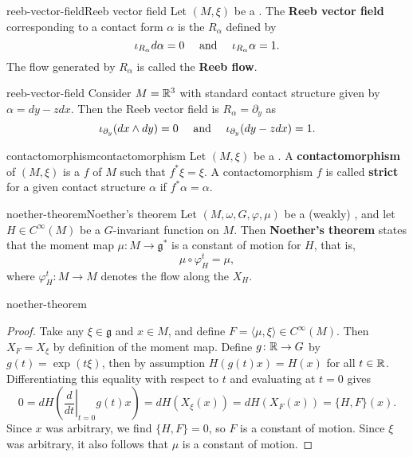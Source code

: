 \begin{topic}{reeb-vector-field}{Reeb vector field}
    Let $(M, \xi)$ be a . The \textbf{Reeb vector field} corresponding to a contact form $\alpha$ is the  $R_\alpha$ defined by
    \[ \iota_{R_\alpha} d \alpha = 0 \quad \textup{ and } \quad \iota_{R_\alpha} \alpha = 1 . \]
    The flow generated by $R_\alpha$ is called the \textbf{Reeb flow}.
\end{topic}

\begin{example}{reeb-vector-field}
    Consider $M = \mathbb{R}^3$ with standard contact structure given by $\alpha = dy - z dx$. Then the Reeb vector field is $R_\alpha = \partial_y$ as
    \[ \iota_{\partial_y} (dx \wedge dy) = 0 \quad \textup{ and } \quad \iota_{\partial_y} (dy - z dx) = 1 . \]
\end{example}

\begin{topic}{contactomorphism}{contactomorphism}
    Let $(M, \xi)$ be a . A \textbf{contactomorphism} of $(M, \xi)$ is a  $f$ of $M$ such that $f^* \xi = \xi$. A contactomorphism $f$ is called \textbf{strict} for a given contact structure $\alpha$ if $f^* \alpha = \alpha$.
\end{topic}

\begin{topic}{noether-theorem}{Noether's theorem}
    Let $(M, \omega, G, \varphi, \mu)$ be a (weakly) , and let $H \in C^\infty(M)$ be a $G$-invariant function on $M$. Then \textbf{Noether's theorem} states that the moment map $\mu \colon M \to \mathfrak{g}^*$ is a constant of motion for $H$, that is,
    \[ \mu \circ \varphi_H^t = \mu , \]
    where $\varphi_H^t \colon M \to M$ denotes the flow along the  $X_H$.
\end{topic}

\begin{example}{noether-theorem}
    \begin{proof}
        Take any $\xi \in \mathfrak{g}$ and $x \in M$, and define $F = \langle \mu, \xi \rangle \in C^\infty(M)$. Then $X_F = X_\xi$ by definition of the moment map. Define $g \colon \mathbb{R} \to G$ by $g(t) = \exp(t \xi)$, then by assumption $H(g(t) x) = H(x)$ for all $t \in \mathbb{R}$. Differentiating this equality with respect to $t$ and evaluating at $t = 0$ gives
        \[ 0 = dH \left(\left.\frac{d}{dt}\right|_{t = 0} g(t) x\right) = dH \left(X_\xi(x)\right) = dH(X_F(x)) = \{ H, F \}(x) . \]
        Since $x$ was arbitrary, we find $\{ H, F \} = 0$, so $F$ is a constant of motion. Since $\xi$ was arbitrary, it also follows that $\mu$ is a constant of motion.
    \end{proof}
\end{example}

